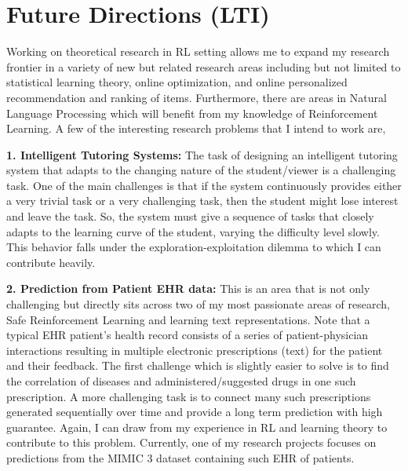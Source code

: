 \documentclass{article}
\begin{document}
	
\vspace*{-2em}
\section{Future Directions (LTI)}
\vspace*{-1em}

Working on theoretical research in RL setting allows me to expand my research frontier in a variety of new but related research areas including but not limited to statistical learning theory, online optimization, and online personalized recommendation and ranking of items. Furthermore, there are areas in Natural Language Processing which will benefit from my knowledge of Reinforcement Learning. A few of the interesting research problems that I intend to work are,

\textbf{1. Intelligent Tutoring Systems:} The task of designing an intelligent tutoring system that adapts to the changing nature of the student/viewer is a challenging task. One of the main challenges is that if the system continuously provides either a very trivial task or a very challenging task, then the student might lose interest and leave the task. So, the system must give a sequence of tasks that closely adapts to the learning curve of the student, varying the difficulty level slowly. This behavior falls under the exploration-exploitation dilemma to which I can contribute heavily.

\textbf{2. Prediction from Patient EHR data:} This is an area that is not only challenging but directly sits across two of my most passionate areas of research, Safe Reinforcement Learning and learning text representations. Note that a typical EHR patient's health record consists of a series of patient-physician interactions resulting in multiple electronic prescriptions (text) for the patient and their feedback. The first challenge which is slightly easier to solve is to find the correlation of diseases and administered/suggested drugs in one such prescription. A more challenging task is to connect many such prescriptions generated sequentially over time and provide a long term prediction with high guarantee. Again, I can draw from my experience in RL and learning theory to contribute to this problem. Currently, one of my research projects focuses on predictions from the MIMIC 3 dataset containing such EHR of patients.
\end{document}
